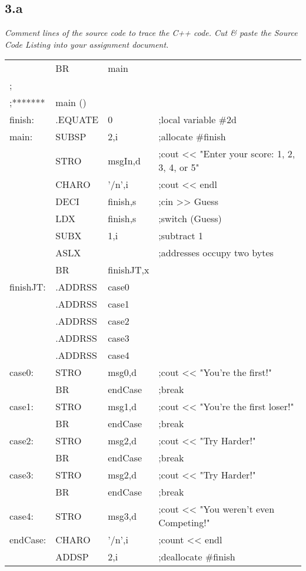 \documentclass[a4paper,man,natbib]{apa6}
\begin{document}
\subsection{3.a}
\emph{Comment lines of the source code to trace the C++ code. Cut \& paste the Source Code Listing into your assignment document.}

	\begin{tabular}{l l l l}
   &     BR    & main & \\ 
; &&& \\
;*******&main ()&&\\
finish: &.EQUATE& 0         &;local variable \#2d \\
main:   &SUBSP  & 2,i        &;allocate \#finish \\
	& STRO  &msgIn,d     & ;cout << "Enter your score: 1, 2, 3, 4, or 5" \\
	& CHARO  &'$\slash$n',i & ;cout << endl \\
	& DECI   &finish,s    &;cin >> Guess \\
	& LDX    &finish,s    &;switch (Guess) \\
	& SUBX   &1,i         &;subtract 1 \\
	& ASLX   &            &;addresses occupy two bytes \\
	& BR     & finishJT,x   & \\
finishJT:&.ADDRSS & case0 &\\      
	&.ADDRSS &case1  &\\     
	&.ADDRSS &case2  &\\  
	&.ADDRSS &case3	 &\\
	&.ADDRSS &case4  &\\   
case0:&  STRO  &  msg0,d  &;cout << "You're the first!" \\
	&BR     &endCase      &;break \\
case1:&   STRO &  msg1,d  &;cout << "You're the first loser!" \\
	&	BR     &endCase   &;break \\
case2:&  STRO  & msg2,d   &;cout << "Try Harder!" \\
	&	BR     &endCase   &;break\\
case3:&  STRO  & msg2,d   &;cout << "Try Harder!" \\
	&	BR     &endCase   &;break \\
case4:&   STRO &  msg3,d   &;cout << "You weren't even Competing!" \\
endCase:&CHARO & '$\slash$n',i &;count << endl \\
	&	ADDSP  &2,i       &;deallocate \#finish \\

\end{tabular}
\end{document}
